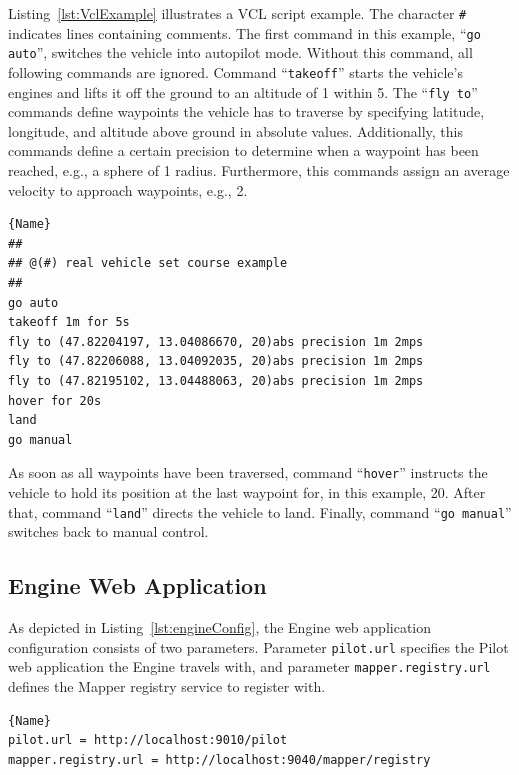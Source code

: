Listing~\ref{lst:VclExample} illustrates a \ac{VCL} script example. 
The character \texttt{\#} indicates lines containing comments.
%
The first command in this example, ``\texttt{go auto}'', switches the vehicle into autopilot mode. Without
this command, all following commands are ignored. Command ``\texttt{takeoff}'' starts the vehicle's engines
and lifts it off the ground to an altitude of \unit{1}{\meter} within \unit{5}{\second}.
%
The ``\texttt{fly to}'' commands define waypoints the vehicle has to traverse by specifying latitude, longitude,
and altitude above ground in absolute values. Additionally, this commands define a certain precision to
determine when a waypoint has been reached, e.g., a sphere of \unit{1}{\meter} radius. Furthermore, this commands
assign an average velocity to approach waypoints, e.g., \unit{2}{\meter\per\second}.
% 
\lstset{tabsize=3,language=Tex}
\begin{lstlisting}[caption={Vehicle Control Language Example},mathescape=true,label=lst:VclExample]{Name}
##
## @(#) real vehicle set course example
##
go auto
takeoff 1m for 5s
fly to (47.82204197, 13.04086670, 20)abs precision 1m 2mps
fly to (47.82206088, 13.04092035, 20)abs precision 1m 2mps
fly to (47.82195102, 13.04488063, 20)abs precision 1m 2mps
hover for 20s
land
go manual
\end{lstlisting}
%
As soon as all waypoints have been traversed, command ``\texttt{hover}'' instructs the vehicle to hold its
position at the last waypoint for, in this example, \unit{20}{\second}. After that, command ``\texttt{land}''
directs the vehicle to land. Finally, command ``\texttt{go manual}'' switches back to manual control.


\subsection{Engine Web Application}

As depicted in Listing~\ref{lst:engineConfig}, the Engine web application configuration consists
of two parameters. Parameter \texttt{pilot.url} specifies the Pilot web application the Engine
travels with, and parameter \texttt{mapper.registry.url} defines the Mapper registry service to
register with.
\lstset{tabsize=3,language=Tex}
\begin{lstlisting}[caption={Engine Configuration Example},mathescape=true,label=lst:engineConfig]{Name}
pilot.url = http://localhost:9010/pilot
mapper.registry.url = http://localhost:9040/mapper/registry
\end{lstlisting}



